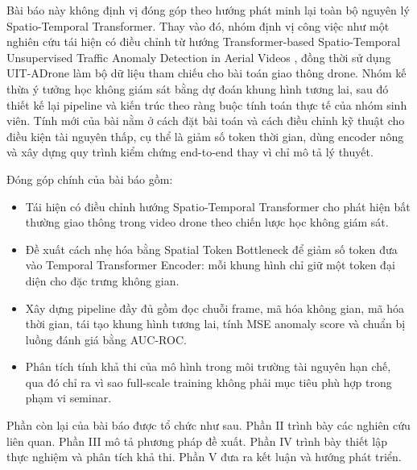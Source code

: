 Bài báo này không định vị đóng góp theo hướng phát minh lại toàn bộ nguyên lý Spatio-Temporal Transformer. Thay vào đó, nhóm định vị công việc như một nghiên cứu tái hiện có điều chỉnh từ hướng Transformer-based Spatio-Temporal Unsupervised Traffic Anomaly Detection in Aerial Videos \cite{c1}, đồng thời sử dụng UIT-ADrone \cite{c2} làm bộ dữ liệu tham chiếu cho bài toán giao thông drone. Nhóm kế thừa ý tưởng học không giám sát bằng dự đoán khung hình tương lai, sau đó thiết kế lại pipeline và kiến trúc theo ràng buộc tính toán thực tế của nhóm sinh viên. Tính mới của bài nằm ở cách đặt bài toán và cách điều chỉnh kỹ thuật cho điều kiện tài nguyên thấp, cụ thể là giảm số token thời gian, dùng encoder nông và xây dựng quy trình kiểm chứng end-to-end thay vì chỉ mô tả lý thuyết.

Đóng góp chính của bài báo gồm:
\begin{itemize}
    \item Tái hiện có điều chỉnh hướng Spatio-Temporal Transformer cho phát hiện bất thường giao thông trong video drone theo chiến lược học không giám sát.
    \item Đề xuất cách nhẹ hóa bằng Spatial Token Bottleneck để giảm số token đưa vào Temporal Transformer Encoder: mỗi khung hình chỉ giữ một token đại diện cho đặc trưng không gian.
    \item Xây dựng pipeline đầy đủ gồm đọc chuỗi frame, mã hóa không gian, mã hóa thời gian, tái tạo khung hình tương lai, tính MSE anomaly score và chuẩn bị luồng đánh giá bằng AUC-ROC.
    \item Phân tích tính khả thi của mô hình trong môi trường tài nguyên hạn chế, qua đó chỉ ra vì sao full-scale training không phải mục tiêu phù hợp trong phạm vi seminar.
\end{itemize}

Phần còn lại của bài báo được tổ chức như sau. Phần II trình bày các nghiên cứu liên quan. Phần III mô tả phương pháp đề xuất. Phần IV trình bày thiết lập thực nghiệm và phân tích khả thi. Phần V đưa ra kết luận và hướng phát triển.
